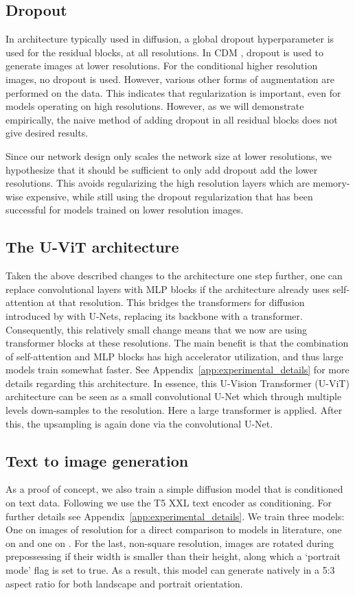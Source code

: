 \documentclass[nohyperref]{article}
\theoremstyle{plain}
\theoremstyle{definition}
\theoremstyle{remark}
\begin{document}
\subsection{Dropout}
In architecture typically used in diffusion, a global dropout hyperparameter is used for the residual blocks, at all resolutions. In CDM \citep{ho2022cascaded}, dropout is used to generate images at lower resolutions. For the conditional higher resolution images, no dropout is used. However, various other forms of augmentation are performed on the data. This indicates that regularization is important, even for models operating on high resolutions. However, as we will demonstrate empirically, the naive method of adding dropout in all residual blocks does not give desired results. 

Since our network design only scales the network size at lower resolutions, we hypothesize that it should be sufficient to only add dropout add the lower resolutions. This avoids regularizing the high resolution layers which are memory-wise expensive, while still using the dropout regularization that has been successful for models trained on lower resolution images.

\subsection{The U-ViT architecture}
Taken the above described changes to the architecture one step further, one can replace convolutional layers with MLP blocks if the architecture already uses self-attention at that resolution. This bridges the transformers for diffusion introduced by \citep{peebles2022scalable} with U-Nets, replacing its backbone with a transformer. Consequently, this relatively small change means that we now are using transformer blocks at these resolutions. The main benefit is that the combination of self-attention and MLP blocks has high accelerator utilization, and thus large models train somewhat faster. See Appendix~\ref{app:experimental_details} for more details regarding this architecture. In essence, this U-Vision Transformer (U-ViT) architecture can be seen as a small convolutional U-Net which through multiple levels down-samples to the  resolution. Here a large transformer is applied. After this, the upsampling is again done via the convolutional U-Net.

\subsection{Text to image generation}
As a proof of concept, we also train a simple diffusion model that is conditioned on text data. Following \citep{saharia2022imagen} we use the T5 XXL \citep{raffel2020exploring} text encoder as conditioning. For further details see Appendix~\ref{app:experimental_details}. We train three models: One on images of resolution  for a direct comparison to models in literature, one on  and one on . For the last, non-square resolution, images are rotated during prepossessing if their width is smaller than their height, along which a `portrait mode' flag is set to true. As a result, this model can generate natively in a 5:3 aspect ratio for both landscape and portrait orientation. 
\end{document}

